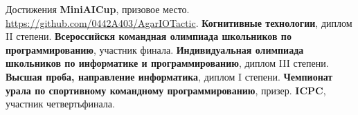 \begin{rubric}{Достижения}
\entry*[2018]
	\textbf{MiniAICup}, призовое место. \url{https://github.com/0442A403/AgarIOTactic}.
\entry*[2018]
	\textbf{Когнитивные технологии}, диплом II степени.
\entry*[2018]
	\textbf{Всероссийскя командная олимпиада школьников по программированию}, участник финала.
\entry*[2019]
	\textbf{Индивидуальная олимпиада школьников по информатике и программированию}, диплом III степени.
\entry*[2019]
	\textbf{Высшая проба, направление информатика}, диплом I степени.
\entry*[2019]
	\textbf{Чемпионат урала по спортивному командному программированию}, призер.
\entry*[2020]
	\textbf{ICPC}, участник четвертьфинала.
\end{rubric}